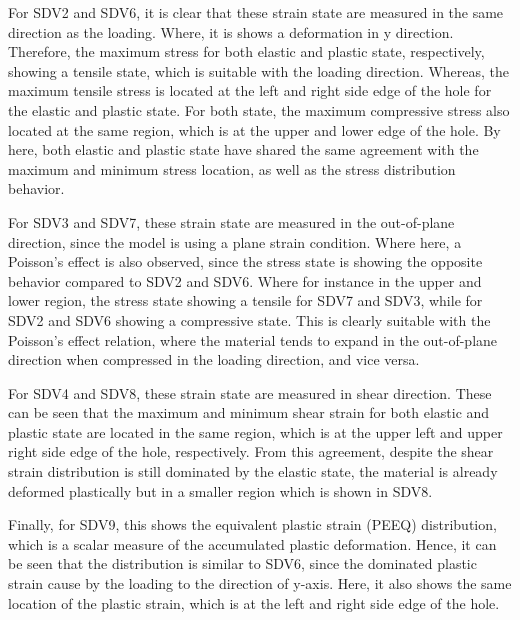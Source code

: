 \documentclass[12pt]{article}
\begin{document}
\hspace{2em}For SDV2 and SDV6, it is clear that these strain state are measured in the same direction as the loading. Where, it is shows
a deformation in y direction.
Therefore, the maximum stress for both elastic and plastic state, respectively,
showing a tensile state, which is suitable with the loading direction. Whereas, 
the maximum tensile stress is located at the 
left and right side edge of the hole for the elastic and plastic state. For both state, 
the maximum compressive stress also located at the same region, which is at the 
upper and lower edge of the hole. By here, both elastic and plastic state have shared the same agreement
with the maximum and minimum stress location, as well as the stress distribution behavior.

\hspace{2em}For SDV3 and SDV7, 
these strain state are measured in the out-of-plane direction, since the model is using 
a plane strain condition. Where here, a Poisson's effect is also observed, since the stress state is
showing the opposite behavior compared to SDV2 and SDV6. Where for instance in the upper and lower region, the stress 
state showing a tensile for SDV7 and SDV3, while for SDV2 and SDV6 showing a compressive state. This is clearly
suitable with the Poisson's effect relation, where the material tends to 
expand in the out-of-plane direction when compressed in the loading direction, 
and vice versa.

\hspace{2em}For SDV4 and SDV8, these strain state are measured in shear direction. These can be seen that
the maximum and minimum shear strain for both elastic and plastic state are located in
the same region, which is at the upper left and upper right side edge of the hole, respectively. From this agreement, despite
the shear strain distribution is still dominated by the elastic state, the material is already
deformed plastically but in a smaller region which is shown in SDV8. 

\hspace{2em}Finally, for SDV9, this shows the equivalent plastic strain (PEEQ)
distribution, which is a scalar measure of the accumulated plastic deformation. Hence, it 
can be seen that the distribution is similar to SDV6, since the dominated plastic strain cause by the
loading to the direction of y-axis. Here, it also shows the same location of the plastic strain, which
is at the left and right side edge of the hole.
\end{document}
